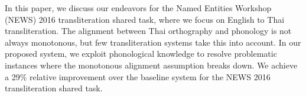 In this paper, we discuss our endeavors for the Named Entities Workshop (NEWS) 2016 transliteration shared task, where we focus on English to Thai transliteration. The alignment between Thai orthography and phonology is not always monotonous, but few transliteration systems take this into account. In our proposed system, we exploit phonological knowledge to resolve problematic instances where the monotonous alignment assumption breaks down. We achieve a 29\% relative improvement over the baseline system for the NEWS 2016 transliteration shared task.
